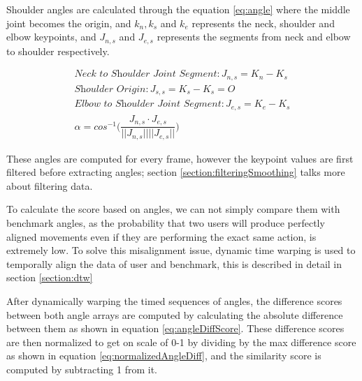 Shoulder angles are calculated through the equation \ref{eq:angle} where the middle joint becomes the origin, and $k_n, k_s$ and $k_e$ represents the neck, shoulder and elbow keypoints, and $J_{n,s}$ and $J_{e,s}$ represents the segments from neck  and elbow to shoulder respectively. 

\begin{gather}
  \textit{Neck to Shoulder Joint Segment}: J_{n,s} = K_n - K_s \\
  \textit{Shoulder Origin}: J_{s,s} = K_s - K_s = O \\
  \textit{Elbow to Shoulder Joint Segment}: J_{e,s} = K_e - K_s \\
  \alpha = cos^{-1} \big (\dfrac{J_{n,s} \cdot J_{e,s}}{||J_{n,s}|| ||J_{e,s}||})
  \label{eq:angle}
\end{gather}

These angles are computed for every frame, however the keypoint values are first filtered before extracting angles; section \ref{section:filteringSmoothing} talks more about filtering data. 

To calculate the score based on angles, we can not simply compare them with benchmark angles, as the probability that two users will produce perfectly aligned movements even if they are performing the exact same action, is extremely low. To solve this misalignment issue, dynamic time warping is used to temporally align the data of user and benchmark, this is described in detail in section \ref{section:dtw}

After dynamically warping the timed sequences of angles, the difference scores between both angle arrays are computed by calculating the absolute difference between them as shown in equation \ref{eq:angleDiffScore}. 
These difference scores are then normalized to get on scale of 0-1 by dividing by the max difference score as shown in equation \ref{eq:normalizedAngleDiff}, and the similarity score is computed by subtracting 1 from it. 

